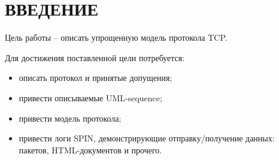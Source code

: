 \section*{ВВЕДЕНИЕ}

Цель работы -- описать упрощенную модель протокола TCP.

Для достижения поставленной цели потребуется:
\begin{itemize}
	\item описать протокол и принятые допущения;
	\item привести описываемые UML-sequence;
	\item привести модель протокола;
	\item привести логи SPIN, демонстрирующие отправку/получение данных: пакетов, HTML-документов и прочего.
\end{itemize}

\pagebreak